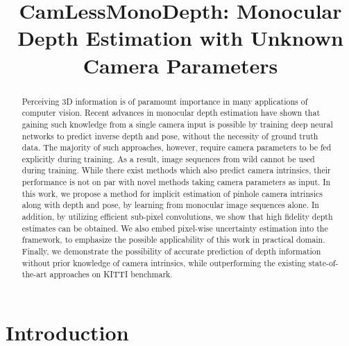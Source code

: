 \documentclass{bmvc2k}
\title{CamLessMonoDepth: Monocular Depth Estimation with Unknown Camera Parameters}
\begin{document}
\maketitle

\begin{abstract}
Perceiving 3D information is of paramount importance in many applications of computer vision. Recent advances in monocular depth estimation have shown that gaining such knowledge from a single camera input is possible by training deep neural networks to predict inverse depth and pose, without the necessity of ground truth data. The majority of such approaches, however, require camera parameters to be fed explicitly during training. As a result, image sequences from wild cannot be used during training. While there exist methods which also predict camera intrinsics, their performance is not on par with novel methods taking camera parameters as input. In this work, we propose a method for implicit estimation of pinhole camera intrinsics along with depth and pose, by learning from monocular image sequences alone. In addition, by utilizing efficient sub-pixel convolutions, we show that high fidelity depth estimates can be obtained. We also embed pixel-wise uncertainty estimation into the framework, to emphasize the possible applicability of this work in practical domain. Finally, we demonstrate the possibility of accurate prediction of depth information without prior knowledge of camera intrinsics, while outperforming the existing state-of-the-art approaches on KITTI benchmark.

\end{abstract}
\vspace{-10pt}
\section{Introduction}
\label{sec:intro}
\end{document}
